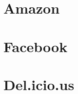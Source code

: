 \documentclass[11pt,a4paper]{article}
\begin{document}
\section{Amazon}

\section{Facebook}

\section{Del.icio.us}
\end{document}
